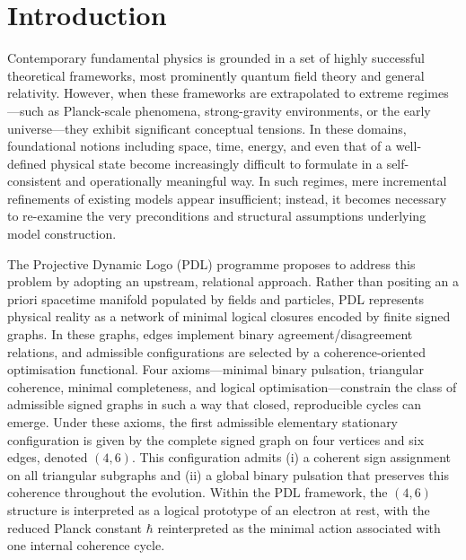 \documentclass[11pt,a4paper]{article}
\begin{document}
\section{Introduction}
Contemporary fundamental physics is grounded in a set of highly successful theoretical frameworks, most prominently quantum field theory and general relativity. However, when these frameworks are extrapolated to extreme regimes—such as Planck-scale phenomena, strong-gravity environments, or the early universe—they exhibit significant conceptual tensions. In these domains, foundational notions including space, time, energy, and even that of a well-defined physical state become increasingly difficult to formulate in a self-consistent and operationally meaningful way.\cite{LaubscherPDLFull2026,LaubscherIMRadPDL2026} In such regimes, mere incremental refinements of existing models appear insufficient; instead, it becomes necessary to re-examine the very preconditions and structural assumptions underlying model construction.

The Projective Dynamic Logo (PDL) programme proposes to address this problem by adopting an upstream, relational approach. Rather than positing an a priori spacetime manifold populated by fields and particles, PDL represents physical reality as a network of minimal logical closures encoded by finite signed graphs. In these graphs, edges implement binary agreement/disagreement relations, and admissible configurations are selected by a coherence-oriented optimisation functional.\cite{LaubscherIntroPDL2026,LaubscherPDLFull2026,LaubscherLDP2026,LaubscherIMRadPDL2026} Four axioms—minimal binary pulsation, triangular coherence, minimal completeness, and logical optimisation—constrain the class of admissible signed graphs in such a way that closed, reproducible cycles can emerge. Under these axioms, the first admissible elementary stationary configuration is given by the complete signed graph on four vertices and six edges, denoted $(4,6)$. This configuration admits (i) a coherent sign assignment on all triangular subgraphs and (ii) a global binary pulsation that preserves this coherence throughout the evolution.\cite{LaubscherPDLFull2026,LaubscherLDP2026,LaubscherIMRadPDL2026} Within the PDL framework, the $(4,6)$ structure is interpreted as a logical prototype of an electron at rest, with the reduced Planck constant $\hbar$ reinterpreted as the minimal action associated with one internal coherence cycle.\cite{LaubscherIntroPDL2026,LaubscherPDLFull2026,LaubscherLDP2026}
\end{document}
